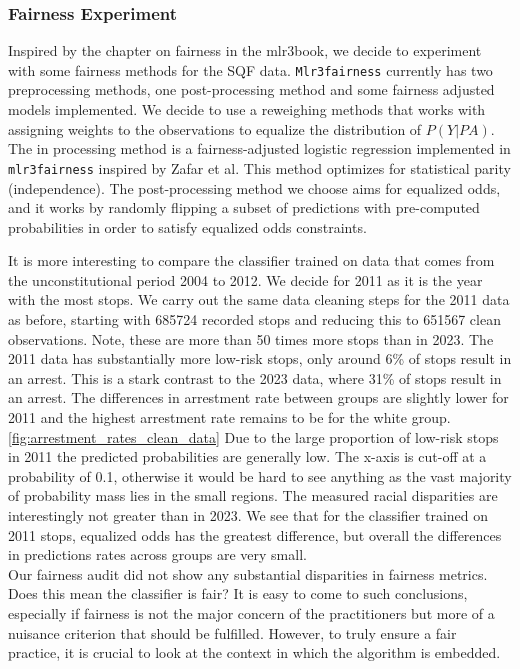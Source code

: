 \subsubsection*{Fairness Experiment}
Inspired by the chapter on fairness in the mlr3book, we decide to experiment with some fairness methods for the SQF data. \texttt{Mlr3fairness} currently has two preprocessing methods, one post-processing method and some fairness adjusted models implemented. We decide to use a reweighing methods that works with assigning weights to the observations to equalize the distribution of $P(Y|PA)$.
The in processing method is a fairness-adjusted logistic regression implemented in \texttt{mlr3fairness} inspired by Zafar et al. This method optimizes for statistical parity (independence). The post-processing method we choose aims for equalized odds, and it works by randomly flipping a subset of predictions with pre-computed probabilities in order to satisfy equalized odds constraints.

It is more interesting to compare the classifier trained on data that comes from the unconstitutional period 2004 to 2012. We decide for 2011 as it is the year with the most stops.
We carry out the same data cleaning steps for the 2011 data as before, starting with 685724 recorded stops and reducing this to 651567 clean observations. Note, these are more than 50 times more stops than in 2023.
The 2011 data has substantially more low-risk stops, only around 6\% of stops result in an arrest. This is a stark contrast to the 2023 data, where 31\% of stops result in an arrest.
The differences in arrestment rate between groups are slightly lower for 2011 and the highest arrestment rate remains to be for the white group. \autoref{fig:arrestment_rates_clean_data}
Due to the large proportion of low-risk stops in 2011 the predicted probabilities are generally low. The x-axis is cut-off at a probability of 0.1, otherwise it would be hard to see anything as the vast majority of probability mass lies in the small regions.
The measured racial disparities are interestingly not greater than in 2023. We see that for the classifier trained on 2011 stops, equalized odds has the greatest difference, but overall the differences in predictions rates across groups are very small. \\ 
Our fairness audit did not show any substantial disparities in fairness metrics. Does this mean the classifier is fair?
It is easy to come to such conclusions, especially if fairness is not the major concern of the practitioners but more of a nuisance criterion that should be fulfilled. However, to truly ensure a fair practice, it is crucial to look at the context in which the algorithm is embedded.

